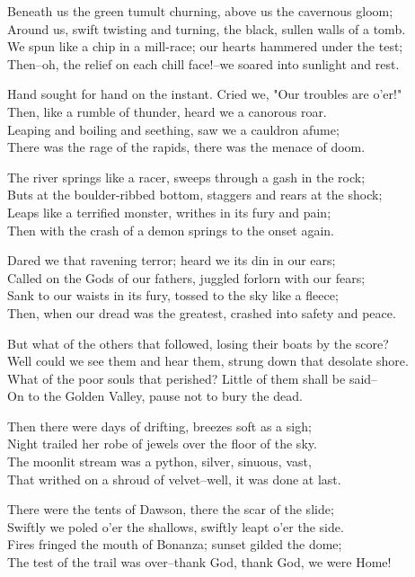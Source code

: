 \begin{poemblock}
Beneath us the green tumult churning, above us the cavernous gloom;\\
Around us, swift twisting and turning, the black, sullen walls of a tomb.\\
We spun like a chip in a mill-race; our hearts hammered under the test;\\
Then--oh, the relief on each chill face!--we soared into sunlight and rest.

Hand sought for hand on the instant.  Cried we, "Our troubles are o'er!"\\
Then, like a rumble of thunder, heard we a canorous roar.\\
Leaping and boiling and seething, saw we a cauldron afume;\\
There was the rage of the rapids, there was the menace of doom.

The river springs like a racer, sweeps through a gash in the rock;\\
Buts at the boulder-ribbed bottom, staggers and rears at the shock;\\
Leaps like a terrified monster, writhes in its fury and pain;\\
Then with the crash of a demon springs to the onset again.

Dared we that ravening terror; heard we its din in our ears;\\
Called on the Gods of our fathers, juggled forlorn with our fears;\\
Sank to our waists in its fury, tossed to the sky like a fleece;\\
Then, when our dread was the greatest, crashed into safety and peace.

But what of the others that followed, losing their boats by the score?\\
Well could we see them and hear them, strung down that desolate shore.\\
What of the poor souls that perished?  Little of them shall be said--\\
On to the Golden Valley, pause not to bury the dead.

Then there were days of drifting, breezes soft as a sigh;\\
Night trailed her robe of jewels over the floor of the sky.\\
The moonlit stream was a python, silver, sinuous, vast,\\
That writhed on a shroud of velvet--well, it was done at last.

There were the tents of Dawson, there the scar of the slide;\\
Swiftly we poled o'er the shallows, swiftly leapt o'er the side.\\
Fires fringed the mouth of Bonanza; sunset gilded the dome;\\
The test of the trail was over--thank God, thank God, we were Home!
\end{poemblock}

